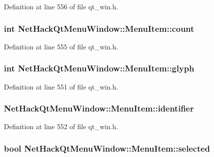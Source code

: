 Definition at line 556 of file qt\+\_\+win.\+h.

\hypertarget{structNetHackQtMenuWindow_1_1MenuItem_a75c190195c82577dd1309c3f324fd82b}{
\subsubsection[{count}]{\setlength{\rightskip}{0pt plus 5cm}int Net\+Hack\+Qt\+Menu\+Window\+::\+Menu\+Item\+::count}}\label{structNetHackQtMenuWindow_1_1MenuItem_a75c190195c82577dd1309c3f324fd82b}


Definition at line 555 of file qt\+\_\+win.\+h.

\hypertarget{structNetHackQtMenuWindow_1_1MenuItem_a180471653f7d74e63ab3ec577ee8835f}{
\subsubsection[{glyph}]{\setlength{\rightskip}{0pt plus 5cm}int Net\+Hack\+Qt\+Menu\+Window\+::\+Menu\+Item\+::glyph}}\label{structNetHackQtMenuWindow_1_1MenuItem_a180471653f7d74e63ab3ec577ee8835f}


Definition at line 551 of file qt\+\_\+win.\+h.

\hypertarget{structNetHackQtMenuWindow_1_1MenuItem_a602690fd0f3de764caa2290157de153a}{
\subsubsection[{identifier}]{ Net\+Hack\+Qt\+Menu\+Window\+::\+Menu\+Item\+::identifier}}\label{structNetHackQtMenuWindow_1_1MenuItem_a602690fd0f3de764caa2290157de153a}


Definition at line 552 of file qt\+\_\+win.\+h.

\hypertarget{structNetHackQtMenuWindow_1_1MenuItem_abe7d4512f8370e59f139834f82e4ed74}{
\subsubsection[{selected}]{\setlength{\rightskip}{0pt plus 5cm}bool Net\+Hack\+Qt\+Menu\+Window\+::\+Menu\+Item\+::selected}}\label{structNetHackQtMenuWindow_1_1MenuItem_abe7d4512f8370e59f139834f82e4ed74}


